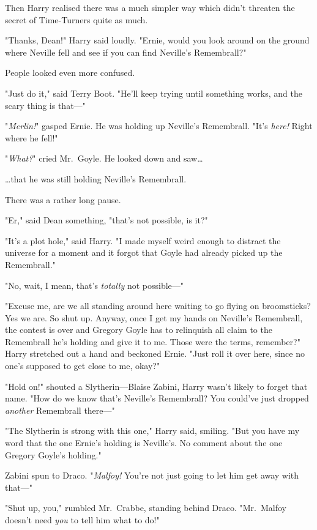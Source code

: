 Then Harry realised there was a much simpler way which didn't threaten the 
secret of Time-Turners quite as much.

"Thanks, Dean!" Harry said loudly. "Ernie, would you look around on the ground 
where Neville fell and see if you can find Neville's Remembrall?"

People looked even more confused.

"Just do it," said Terry Boot. "He'll keep trying until something works, and 
the scary thing is that---"

"\emph{Merlin!}" gasped Ernie. He was holding up Neville's Remembrall. "It's 
\emph{here!} Right where he fell!"

"\emph{What?}" cried Mr.~Goyle. He looked down and saw{\ldots}

{\ldots}that he was still holding Neville's Remembrall.

There was a rather long pause.

"Er," said Dean something, "that's not possible, is it?"

"It's a plot hole," said Harry. "I made myself weird enough to distract the 
universe for a moment and it forgot that Goyle had already picked up the 
Remembrall."

"No, wait, I mean, that's \emph{totally} not possible---"

"Excuse me, are we all standing around here waiting to go flying on 
broomsticks? Yes we are. So shut up. Anyway, once I get my hands on Neville's 
Remembrall, the contest is over and Gregory Goyle has to relinquish all claim 
to the Remembrall he's holding and give it to me. Those were the terms, 
remember?" Harry stretched out a hand and beckoned Ernie. "Just roll it over 
here, since no one's supposed to get close to me, okay?"

"Hold on!" shouted a Slytherin---Blaise Zabini, Harry wasn't likely to forget 
that name. "How do we know that's Neville's Remembrall? You could've just 
dropped \emph{another} Remembrall there---"

"The Slytherin is strong with this one," Harry said, smiling. "But you have my 
word that the one Ernie's holding is Neville's. No comment about the one 
Gregory Goyle's holding."

Zabini spun to Draco. "\emph{Malfoy!} You're not just going to let him get away 
with that---"

"Shut up, you," rumbled Mr.~Crabbe, standing behind Draco. "Mr.~Malfoy doesn't 
need \emph{you} to tell him what to do!"

